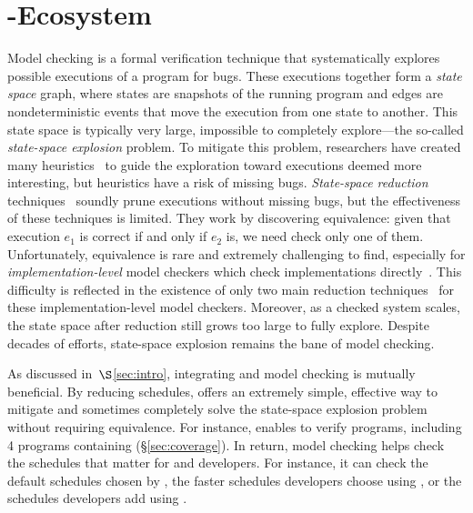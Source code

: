 \section{\xxx-\dbug Ecosystem} \label{sec:mc}



Model checking is a formal verification technique that systematically
explores possible executions of a program for bugs.  These executions
together form a \emph{state space} graph, where states are snapshots of the
running program and edges are nondeterministic events that move the
execution from one state to another.  This state space is typically very
large, impossible to completely explore---the so-called \emph{state-space
  explosion} problem.  To mitigate this problem, researchers have created
many heuristics~\cite{yang:fisc:osdi,musuvathi:aodv,killian:macemc:nsdi07} to guide the exploration toward executions
deemed more interesting, but heuristics have a risk of missing bugs.
\emph{State-space reduction} techniques~\cite{flanagan:dynamicpo,godefroid:verisoft,demeter:sosp11} soundly prune
executions without missing bugs, but the effectiveness of these techniques
is limited.  They work by discovering equivalence: given
that execution $e_1$ is correct if and only if $e_2$ is, we need check only
one of them. Unfortunately, equivalence is rare and extremely challenging
to find, especially for \emph{implementation-level} model checkers which
check implementations directly~\cite{godefroid:verisoft,musuvathi:aodv,yang:fisc:osdi,yang:explode:osdi,killian:macemc:nsdi07,dbug:spin11}.
This difficulty is reflected in the existence of only two main reduction
techniques~\cite{flanagan:dynamicpo, demeter:sosp11} for these implementation-level model
checkers.  Moreover, as a checked system scales, the state space after
reduction still grows too large to fully explore.  Despite
decades of efforts, state-space explosion remains the bane of model
checking.

As discussed in~$\S$\ref{sec:intro}, integrating \smt and model checking is
mutually beneficial.  By reducing schedules, \smt offers an extremely
simple, effective way to mitigate and sometimes completely solve the
state-space explosion problem without requiring equivalence.  For
instance, \xxx enables \dbug to verify \nprogverifiedxxx programs,
including 4 programs containing \nondets (\S\ref{sec:coverage}).
In return, model
checking helps check the schedules that matter for \xxx and developers.
For instance, it can check the default schedules chosen by \xxx, the
faster schedules developers choose using \computes, or the schedules
developers add using \nondets.

